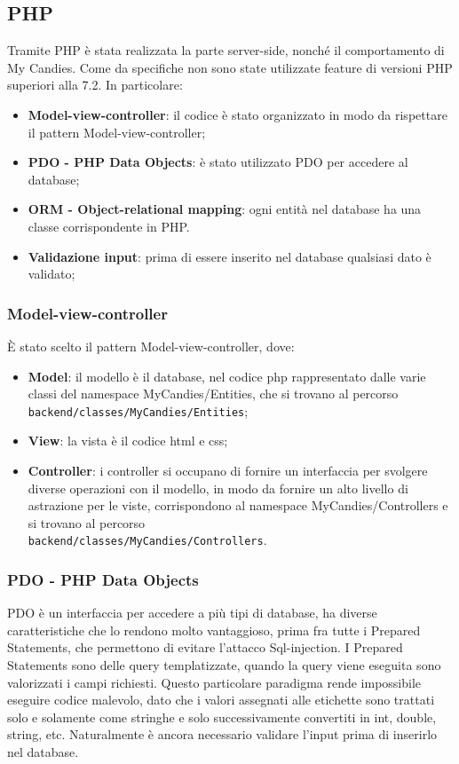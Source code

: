 \subsection{PHP}
Tramite PHP è stata realizzata la parte server-side, nonché il comportamento di My Candies. Come da specifiche non sono state utilizzate feature di versioni PHP superiori alla 7.2.
In particolare:
\begin{itemize}
    \item \textbf{Model-view-controller}: il codice è stato organizzato in modo da rispettare il pattern Model-view-controller;
    \item \textbf{PDO - PHP Data Objects}: è stato utilizzato PDO per accedere al database;
    \item \textbf{ORM - Object-relational mapping}: ogni entità nel database ha una classe corrispondente in PHP.
    \item \textbf{Validazione input}: prima di essere inserito nel database qualsiasi dato è validato;
\end{itemize}

\subsubsection{Model-view-controller}
È stato scelto il pattern Model-view-controller, dove:
\begin{itemize}
    \item \textbf{Model}: il modello è il database, nel codice php rappresentato dalle varie classi del namespace MyCandies/Entities, che si trovano al percorso \texttt{backend/classes/MyCandies/Entities};
    \item \textbf{View}: la vista è il codice html e css;
     \item \textbf{Controller}: i controller si occupano di fornire un interfaccia per svolgere diverse operazioni con il modello, in modo da fornire un alto livello di astrazione per le viste, corrispondono al namespace MyCandies/Controllers e si trovano al percorso \\ \texttt{backend/classes/MyCandies/Controllers}.
\end{itemize}
\subsubsection{PDO - PHP Data Objects}
PDO è un interfaccia per accedere a più tipi di database, ha diverse caratteristiche che lo rendono molto vantaggioso, prima fra tutte i Prepared Statements, che permettono di evitare l'attacco Sql-injection.
I Prepared Statements sono delle query templatizzate, quando la query viene eseguita sono valorizzati i campi richiesti. Questo particolare paradigma rende impossibile eseguire codice malevolo, dato che i valori assegnati alle etichette sono trattati solo e solamente come stringhe e solo successivamente convertiti in int, double, string, etc. Naturalmente è ancora necessario validare l'input prima di inserirlo nel database.
